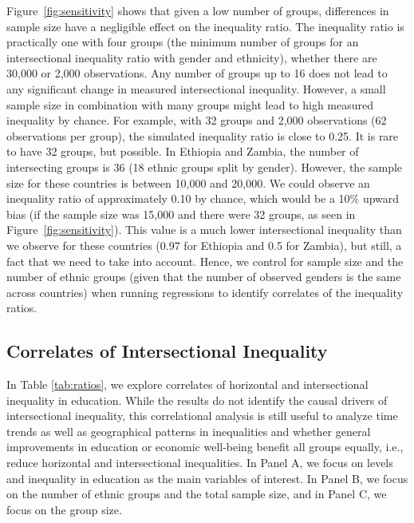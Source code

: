 Figure~\ref{fig:sensitivity} shows that given a low number of groups, differences in sample size have a negligible effect on the inequality ratio. The inequality ratio is practically one with four groups (the minimum number of groups for an intersectional inequality ratio with gender and ethnicity), whether there are 30,000 or 2,000 observations. Any number of groups up to 16 does not lead to any significant change in measured intersectional inequality. However, a small sample size in combination with many groups might lead to high measured inequality by chance. For example, with 32 groups and 2,000 observations (62 observations per group), the simulated inequality ratio is close to 0.25. It is rare to have 32 groups, but possible. In Ethiopia and Zambia, the number of intersecting groups is 36 (18 ethnic groups split by gender). However, the sample size for these countries is between 10,000 and 20,000. We could observe an inequality ratio of approximately 0.10 by chance, which would be a 10\% upward bias (if the sample size was 15,000 and there were 32 groups, as seen in Figure~\ref{fig:sensitivity}). This value is a much lower intersectional inequality than we observe for these countries (0.97 for Ethiopia and 0.5 for Zambia), but still, a fact that we need to take into account. Hence, we control for sample size and the number of ethnic groups (given that the number of observed genders is the same across countries) when running regressions to identify correlates of the inequality ratios.

\hypertarget{correlates-of-intersectional-inequality}{%
\subsection{Correlates of Intersectional Inequality}\label{correlates-of-intersectional-inequality}}

In Table \ref{tab:ratios}, we explore correlates of horizontal and intersectional inequality in education. While the results do not identify the causal drivers of intersectional inequality, this correlational analysis is still useful to analyze time trends as well as geographical patterns in inequalities and whether general improvements in education or economic well-being benefit all groups equally, i.e., reduce horizontal and intersectional inequalities. In Panel A, we focus on levels and inequality in education as the main variables of interest. In Panel B, we focus on the number of ethnic groups and the total sample size, and in Panel C, we focus on the group size. 

